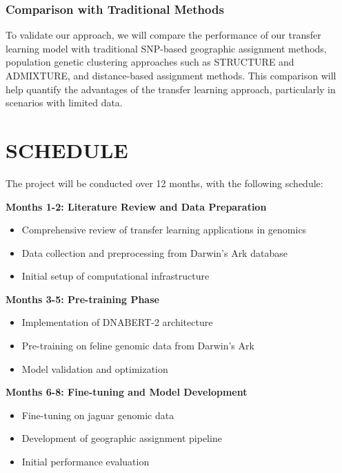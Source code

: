 \subsubsection{Comparison with Traditional Methods}

To validate our approach, we will compare the performance of our transfer learning model with traditional SNP-based geographic assignment methods, population genetic clustering approaches such as STRUCTURE \cite{pritchard2000inference} and ADMIXTURE, and distance-based assignment methods. This comparison will help quantify the advantages of the transfer learning approach, particularly in scenarios with limited data.

\section{SCHEDULE}

The project will be conducted over 12 months, with the following schedule:

\textbf{Months 1-2: Literature Review and Data Preparation}

\begin{itemize}
	\item Comprehensive review of transfer learning applications in genomics
	\item Data collection and preprocessing from Darwin's Ark database
	\item Initial setup of computational infrastructure
\end{itemize}

\textbf{Months 3-5: Pre-training Phase}

\begin{itemize}
	\item Implementation of DNABERT-2 architecture
	\item Pre-training on feline genomic data from Darwin's Ark
	\item Model validation and optimization
\end{itemize}

\textbf{Months 6-8: Fine-tuning and Model Development}

\begin{itemize}
	\item Fine-tuning on jaguar genomic data
	\item Development of geographic assignment pipeline
	\item Initial performance evaluation
\end{itemize}

